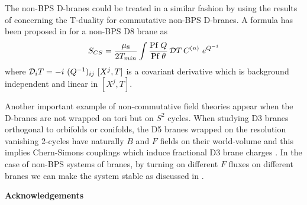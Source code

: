 \documentclass[a4paper,12pt]{article}
\begin{document}
The non-BPS D-branes could be treated in a similar fashion by 
using the results of 
\cite{ga,b2} concerning the T-duality 
for commutative non-BPS D-branes. A formula has been 
proposed in \cite{ms} for a non-BPS D8 brane as
\begin{equation}
S_{CS} = \frac{\mu_{8}}{2T_{min}}\int  {\mbox{Pf}~Q\over \mbox{Pf}~\theta}\,
{\cal D}T\, C^{(n)}~e^{Q^{-1}}
\end{equation}
where ${\cal D}_i T = -i~(Q^{-1})_{ij}~[X^j,T]$ is a covariant derivative 
which is background independent and linear in $[X^j,T]$.

Another important example of non-commutative field theories appear when the
D-branes are not wrapped on tori but on $S^2$ cycles.
When studying D3 branes orthogonal to 
orbifolds or conifolds, the D5 branes wrapped on the resolution vanishing
2-cycles have naturally 
$B$ and $F$ fields on their world-volume and this implies  
Chern-Simons couplings which induce fractional D3 brane charges
\cite{do1,do2,kar,gi,dm2,k1,ot3,bere,ot4}.   
In the case of non-BPS systems of branes, by turning on different $F$ fluxes on
different branes we can make the system stable as discussed in 
\cite{oz,ot5,kr1,li}. 

\vskip 3cm

\centerline{{\Large \bf Acknowledgements}}

\vskip 1cm
\end{document}
